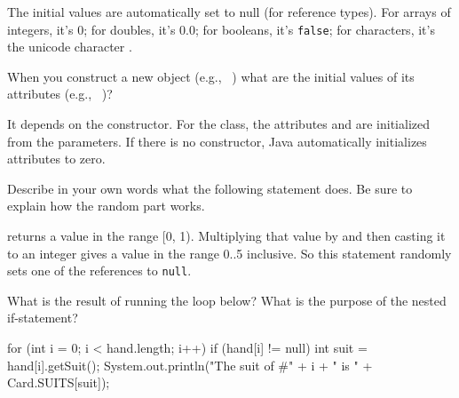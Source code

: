 \begin{answer}
The initial values are automatically set to null (for reference types). For arrays of integers, it's 0; for doubles, it's 0.0; for booleans, it's {\tt false}; for characters, it's the unicode character .
\end{answer}


\Q When you construct a new object (e.g., ~) what are the initial values of its attributes (e.g., ~)?

\begin{answer}
It depends on the constructor. For the  class, the attributes  and  are initialized from the parameters. If there is no constructor, Java automatically initializes attributes to zero.
\end{answer}




\Q \label{random}
Describe in your own words what the following statement does. Be sure to explain how the random part works.

\begin{center}
\end{center}

\begin{answer}
 returns a value in the range [0, 1).
Multiplying that value by  and then casting it to an integer gives a value in the range 0..5 inclusive.
So this statement randomly sets one of the  references to {\tt null}.
\end{answer}


\Q \label{forcard}
What is the result of running the loop below?
What is the purpose of the nested if-statement?

\begin{javalst}
for (int i = 0; i < hand.length; i++) {
    if (hand[i] != null) {
        int suit = hand[i].getSuit();
        System.out.println("The suit of #" + i + " is " + Card.SUITS[suit]);
    }
}
\end{javalst}
\vspace{-1ex}

